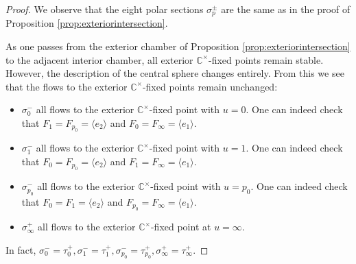 \documentclass[10pt,a4paper]{amsart}
\newcommand{\C}{\ensuremath{\mathbb C}}
\begin{document}
\begin{proof} 
We observe that the eight polar sections $\sigma^\pm_p$ are the same as in the proof of Proposition \ref{prop:exteriorintersection}.

As one passes from the exterior chamber of Proposition \ref{prop:exteriorintersection} to the adjacent interior chamber, all exterior $\C^\times$-fixed points remain stable. However, the description of the central sphere changes entirely. From this we see that the flows to the exterior $\C^\times$-fixed points remain unchanged:
 \begin{itemize}
   \item $\sigma_0^-$ all flows to the exterior $\C^\times$-fixed point with $u=0$. One can indeed check that $F_1=F_{p_0}=\langle e_2\rangle$ and $F_0=F_\infty=\langle e_1\rangle$.
    \item$\sigma_1^-$ all flows to the exterior $\C^\times$-fixed point with $u=1$. One can indeed check that $F_0=F_{p_0}=\langle e_2\rangle$ and $F_1=F_\infty=\langle e_1\rangle$.  
        \item $\sigma_{p_0}^-$ all flows to the exterior $\C^\times$-fixed point with $u=p_0$. One can indeed check that $F_0=F_1=\langle e_2\rangle$ and $F_{p_0}=F_\infty=\langle e_1\rangle$. 
        \item $\sigma_{\infty}^+$ all flows to the exterior $\C^\times$-fixed point at $u=\infty$.
        \end{itemize}
In fact, $\sigma_0^- = \tau_0^+, \sigma_1^-=\tau_1^+, \sigma_{p_0}^-=\tau_{p_0}^+, \sigma_\infty^+ =\tau_\infty^+$. 


\end{proof}
\end{document}
